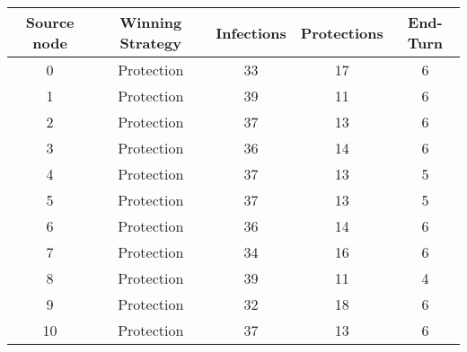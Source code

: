 \documentclass[results.tex]{subfiles}
\begin{document}
    \begin{center}
        \begin{tabular}{| c || c | c | c | c |}
            \hline
            {\bfseries Source node} & {\bfseries Winning Strategy} & {\bfseries Infections} & {\bfseries Protections}
            & {\bfseries End-Turn}
            \\  %
            \hline\hline
            0                       & Protection                   & 33                     & 17                      & 6                    \\
            \hline
            1                       & Protection                   & 39                     & 11                      & 6                    \\
            \hline
            2                       & Protection                   & 37                     & 13                      & 6                    \\
            \hline
            3                       & Protection                   & 36                     & 14                      & 6                    \\
            \hline
            4                       & Protection                   & 37                     & 13                      & 5                    \\
            \hline
            5                       & Protection                   & 37                     & 13                      & 5                    \\
            \hline
            6                       & Protection                   & 36                     & 14                      & 6                    \\
            \hline
            7                       & Protection                   & 34                     & 16                      & 6                    \\
            \hline
            8                       & Protection                   & 39                     & 11                      & 4                    \\
            \hline
            9                       & Protection                   & 32                     & 18                      & 6                    \\
            \hline
            10                      & Protection                   & 37                     & 13                      & 6                    \\

\end{tabular}
\end{center}
\end{document}
